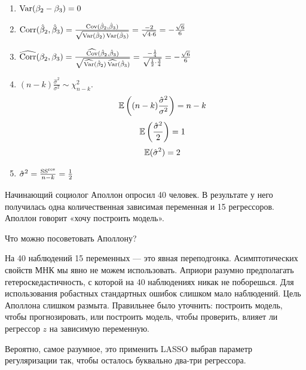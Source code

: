 \begin{problem}
\begin{sol}
\begin{enumerate}
\item $\operatorname{Var}(\beta_2-\beta_3)=0$

\item $\operatorname{Corr}(\hat{\beta}_2,\hat{\beta}_3)=\frac{\operatorname{Cov}(\hat{\beta}_2,\hat{\beta}_3)}{\sqrt{\operatorname{Var}(\hat{\beta}_2)\operatorname{Var}(\hat{\beta}_3)}}=\frac{-2}{\sqrt{4\cdot6}}=-\frac{\sqrt6}{6}$

\item $\operatorname{\widehat{\operatorname{Corr}}}(\beta_2,\beta_3)=\frac{\operatorname{\widehat{\operatorname{Cov}}}(\hat{\beta}_2,\hat{\beta}_3)}{\sqrt{\operatorname{\widehat{\operatorname{Var}}}(\hat{\beta}_2)\operatorname{\widehat{\operatorname{Var}}}(\hat{\beta}_3)}}=\frac{-\frac14}{\sqrt{\frac12\cdot\frac34}}=-\frac{\sqrt6}{6}$

\item $(n-k)\frac{\hat\sigma^2}{\sigma^2}\sim\chi^2_{n-k}$.
\[
\operatorname{\mathbb{E}}\left((n-k)\frac{\hat\sigma^2}{\sigma^2}\right)=n-k
\]
\[
\operatorname{\mathbb{E}}\left(\frac{\hat\sigma^2}{2}\right)=1
\]
\[
\operatorname{\mathbb{E}}(\hat\sigma^2)=2
\]

\item $\hat\sigma^2=\frac{\mathrm{SS}^{\text{res}}}{n-k}=\frac{1}{2}$

\end{enumerate}

\end{sol}
\end{problem}




\begin{problem}
Начинающий социолог Аполлон опросил 40 человек. 
В результате у него получилась одна количественная зависимая переменная и 15 регрессоров.
Аполлон говорит «хочу построить модель». 

Что можно посоветовать Аполлону?
\begin{sol}
На 40 наблюдений 15 переменных — это явная переподгонка. Асимптотических свойств МНК 
мы явно не можем использовать. Априори разумно предполагать гетероскедастичность, 
с которой на 40 наблюдениях никак не поборешься. Для использования робастных стандартных ошибок
слишком мало наблюдений. Цель Аполлона слишком размыта. Правильнее было уточнить:
построить модель, чтобы прогнозировать, или построить модель, чтобы проверить,
влияет ли регрессор $z$ на зависимую переменную. 

Вероятно, самое разумное, это применить LASSO выбрав параметр регуляризации так, 
чтобы осталось буквально два-три регрессора. 
\end{sol}
\end{problem}
  

